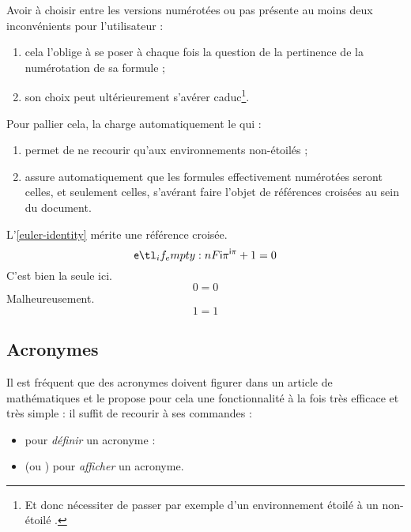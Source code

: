 \documentclass[french,nolocaltoc]{nwejmart}
\newtheorem[title=Fait,style=definition]{fact}
\begin{document}
Avoir à choisir entre les versions numérotées ou pas présente au moins deux
inconvénients pour l'utilisateur :
\begin{enumerate}
\item cela l'oblige à se poser à chaque fois la question de la pertinence de la
  numérotation de sa formule ;
\item son choix peut ultérieurement s'avérer caduc\footnote{Et donc nécessiter
    de passer par exemple d'un environnement étoilé à un non-étoilé .}.
\end{enumerate}
Pour pallier cela, la \nwejmauthorcl{} charge automatiquement le
 qui :
\begin{enumerate}
\item permet de ne recourir qu'aux environnements non-étoilés ;
\item assure automatiquement que les formules effectivement numérotées seront
  celles, et seulement celles, s'avérant faire l'objet de références croisées au
  sein du document.
\end{enumerate}

\begin{bodycode}
L'\vref{euler-identity} mérite une référence croisée.
\begin{equation}\label{euler-identity}
  \E[\I\pi]+1=0
\end{equation}
C'est bien la seule ici.
\begin{equation}\label{not-interesting}
  0=0
\end{equation}
Malheureusement.
\begin{equation}
  1=1
\end{equation}
\end{bodycode}

\subsection{Acronymes}
\label{sec:acronymes}

Il est fréquent que des acronymes doivent figurer dans un article de
mathématiques et le  propose pour cela une fonctionnalité
à la fois très efficace et très simple : il suffit de recourir à ses commandes :
\begin{itemize}
\item {} pour \emph{définir} un acronyme :
\item {} (ou ) pour \emph{afficher} un acronyme.
\end{itemize}
\end{document}
